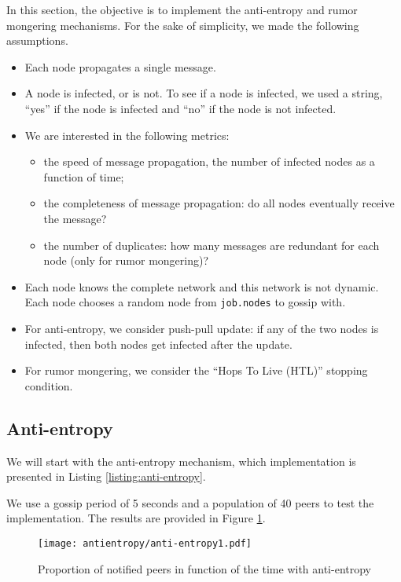 \documentclass[a4paper, 11pt]{article}
\theoremstyle{plain}
\theoremstyle{definition}
\begin{document}
  In this section, the objective is to implement the anti-entropy and rumor mongering mechanisms. For the sake
  of simplicity, we made the following assumptions. 
  \begin{itemize}
  \item Each node propagates a single message.
  \item A node is infected, or is not. To see if a node is infected, we used a string, ``yes'' if the node is
    infected and ``no'' if the node is not infected.
  \item We are interested in the following metrics:
    \begin{itemize}
    \item the speed of message propagation, the number of infected nodes as a function of time;
    \item the completeness of message propagation: do all nodes eventually receive the message?
    \item the number of duplicates: how many messages are redundant for each node (only for rumor mongering)?
    \end{itemize}
  \item Each node knows the complete network and this network is not dynamic. Each node chooses a random node
    from \texttt{job.nodes} to gossip with.
  \item For anti-entropy, we consider push-pull update: if any of the two nodes is infected, then both nodes
    get infected after the update.
  \item For rumor mongering, we consider the ``Hops To Live (HTL)'' stopping condition.
  \end{itemize}

  \subsection{Anti-entropy}
  \label{sec:anti-entropy}

    We will start with the anti-entropy mechanism, which implementation is presented in Listing \ref{listing:anti-entropy}. 

    

    We use a gossip period of 5 seconds and a population of 40 peers to test the implementation. The results
    are provided in Figure \ref{fig:anti-entropy-plot}. 

    \begin{figure}[h]
      \centering
      \texttt{[image: antientropy/anti-entropy1.pdf]}
      \caption{Proportion of notified peers in function of the time with anti-entropy}
      \label{fig:anti-entropy-plot}
    \end{figure}
\end{document}
